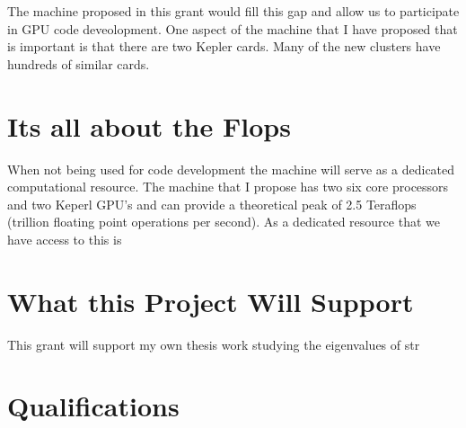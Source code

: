 \documentclass[11pt]{article}
\begin{document}
  The machine proposed in this grant would fill this gap and allow us to participate in GPU code deveolopment.  One aspect of the machine that I have proposed that is important is that there are two Kepler cards.  Many of the new clusters have hundreds of similar cards.  
  
  \section*{Its all about the Flops} %
  When not being used for code development the machine will serve as a dedicated computational resource.  
  The machine that I propose has two six core processors and two Keperl GPU's and can provide a theoretical peak of 2.5 Teraflops (trillion floating point operations per second).  
  As a dedicated resource that we have access to this is

  \section*{What this Project Will Support} %
  This grant will support my own thesis work studying the eigenvalues of str

  \section*{Qualifications} %
\end{document}

